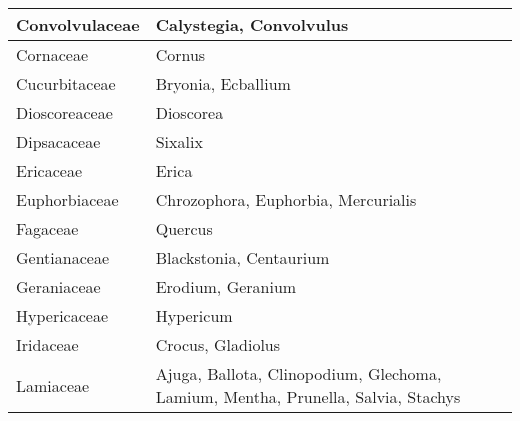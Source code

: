 \documentclass[main.tex]{subfiles}
\begin{document}
\begin{table}[!ht]
\begin{tabular}[\footnotesize]{|p{3cm}|p{9cm}|}
        Convolvulaceae & Calystegia, Convolvulus \\ \hline
        Cornaceae & Cornus \\ \hline
        Cucurbitaceae & Bryonia, Ecballium \\ \hline
        Dioscoreaceae & Dioscorea \\ \hline
        Dipsacaceae & Sixalix \\ \hline
        Ericaceae & Erica \\ \hline
        Euphorbiaceae & Chrozophora, Euphorbia, Mercurialis \\ \hline
        Fagaceae & Quercus \\ \hline
        Gentianaceae & Blackstonia, Centaurium \\ \hline
        Geraniaceae & Erodium, Geranium \\ \hline
        Hypericaceae & Hypericum \\ \hline
        Iridaceae & Crocus, Gladiolus \\ \hline
        Lamiaceae & Ajuga, Ballota, Clinopodium, Glechoma, Lamium, Mentha, Prunella, Salvia, Stachys \\ \hline
        \end{tabular}
    \end{table}
    
    \clearpage
        
\end{document}
